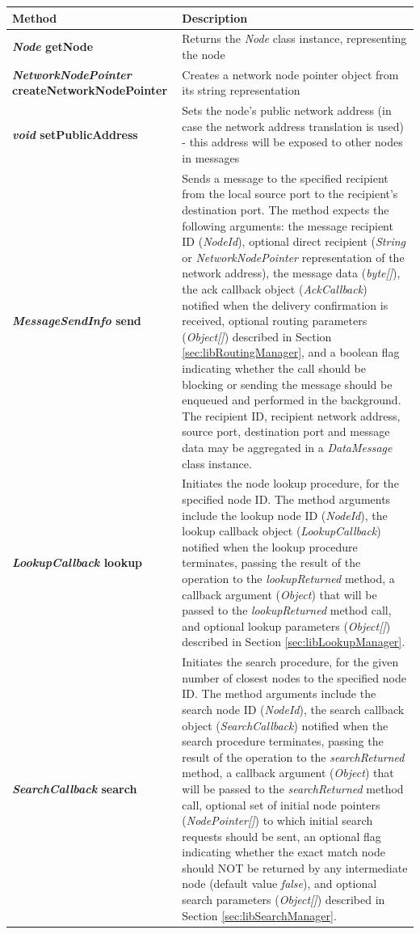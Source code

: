 \begin{center}
\scriptsize
\begin{longtable}{p{6.5cm} p{8.5cm}}
	\hline
	\textbf{Method}																& \textbf{Description}					\\[1mm]
    \hline
	\textbf{\emph{Node} getNode}												& Returns the \emph{Node} class instance, representing the node			\\[1.5mm]
	\textbf{\emph{NetworkNodePointer} createNetworkNodePointer}					& Creates a network node pointer object from its string representation		\\[1.5mm]
    \textbf{\emph{void} setPublicAddress}										& Sets the node's public network address (in case the network address translation is used) - this address will be exposed to other nodes in messages			\\[1.5mm]
	\textbf{\emph{MessageSendInfo} send}										& Sends a message to the specified recipient from the local source port to the recipient's destination port. The method expects the following arguments: the message recipient ID (\emph{NodeId}), optional direct recipient (\emph{String} or \emph{NetworkNodePointer} representation of the network address), the message data (\emph{byte[]}), the ack callback object (\emph{AckCallback}) notified when the delivery confirmation is received, optional routing parameters (\emph{Object[]}) described in Section \ref{sec:libRoutingManager}, and a boolean flag indicating whether the call should be blocking or sending the message should be enqueued and performed in the background. The recipient ID, recipient network address, source port, destination port and message data may be aggregated in a \emph{DataMessage} class instance. 		\\[1.5mm]
	\textbf{\emph{LookupCallback} lookup}										& Initiates the node lookup procedure, for the specified node ID. The method arguments include the lookup node ID (\emph{NodeId}), the lookup callback object (\emph{LookupCallback}) notified when the lookup procedure terminates, passing the result of the operation to the \emph{lookupReturned} method, a callback argument (\emph{Object}) that will be passed to the \emph{lookupReturned} method call, and optional lookup parameters (\emph{Object[]}) described in Section \ref{sec:libLookupManager}.			\\[1.5mm]
	\textbf{\emph{SearchCallback} search}										& Initiates the search procedure, for the given number of closest nodes to the specified node ID. The method arguments include the search node ID (\emph{NodeId}), the search callback object (\emph{SearchCallback}) notified when the search procedure terminates, passing the result of the operation to the \emph{searchReturned} method, a callback argument (\emph{Object}) that will be passed to the \emph{searchReturned} method call, optional set of initial node pointers (\emph{NodePointer[]}) to which initial search requests should be sent, an optional flag indicating whether the exact match node should NOT be returned by any intermediate node (default value \emph{false}), and optional search parameters (\emph{Object[]}) described in Section \ref{sec:libSearchManager}.			\\[1.5mm]

\end{longtable}
\end{center}

